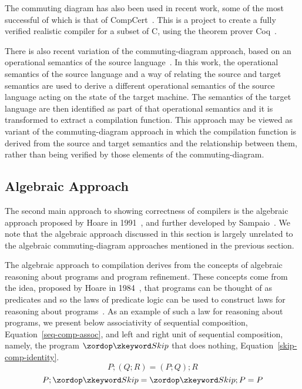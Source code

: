 \documentclass[a4paper,10pt]{report}
\begin{document}
The commuting diagram has also been used in recent work, some of the
most successful of which is that of CompCert~\cite{leroy2009a,
  leroy2009b, leroy2012}.
This is a project to create a fully verified realistic compiler for a
subset of C, using the theorem prover Coq~\cite{coq2004}.

There is also recent variation of the commuting-diagram approach, 
based on an operational semantics of the source
language~\cite{bahr2015}.
In this work, the operational semantics of the source language and
a way of relating the source and target semantics are used to derive a
different operational semantics of the source language acting on the
state of the target machine.
The semantics of the target language are then identified as part of
that operational semantics and it is transformed to extract a
compilation function.
This approach may be viewed as variant of the commuting-diagram
approach in which the compilation function is derived from the source
and target semantics and the relationship between them, rather than
being verified by those elements of the commuting-diagram.

\subsection{Algebraic Approach}
\label{algebraic-approach-subsection}

The second main approach to showing correctness of compilers is the
algebraic approach proposed by Hoare in 1991~\cite{hoare1991}, and
further developed by Sampaio~\cite{hoare1993, sampaio1993,
  sampaio1997}.
We note that the algebraic approach discussed in this section is
largely unrelated to the algebraic commuting-diagram approaches
mentioned in the previous section.

The algebraic approach to compilation derives from the concepts of
algebraic reasoning about programs and program refinement.
These concepts come from the idea, proposed by Hoare in
1984~\cite{hoare1984}, that programs can be thought of as predicates
and so the laws of predicate logic can be used to construct laws for
reasoning about programs~\cite{hoare1987}.
As an example of such a law for reasoning about programs, we present
below associativity of sequential composition,
Equation~\eqref{seq-comp-assoc}, and left and right unit of sequential
composition, namely, the program $\Skip$ that does nothing,
Equation~\eqref{skip-comp-identity}.
\begin{equation}
  \label{seq-comp-assoc}
  P;(Q;R) = (P;Q);R
\end{equation}
\begin{equation}
  \label{skip-comp-identity}
  P;\Skip = \Skip;P = P
\end{equation}
\end{document}
